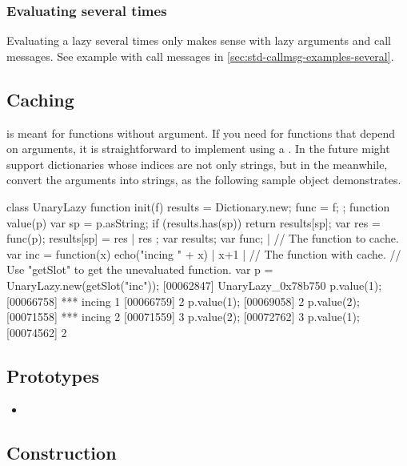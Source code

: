 \subsubsection{Evaluating several times}

Evaluating a lazy several times only makes sense with lazy arguments
and call messages. See example with call messages in
\autoref{sec:std-callmsg-examples-several}.


\subsection{Caching}

 is meant for functions without argument.  If you need
 for functions that depend on arguments, it is
straightforward to implement using a .  In the
future \us might support dictionaries whose indices are not only
strings, but in the meanwhile, convert the arguments into
strings, as the following sample object demonstrates.

\begin{urbiscript}
class UnaryLazy
{
  function init(f)
  {
    results = Dictionary.new;
    func = f;
  };
  function value(p)
  {
    var sp = p.asString;
    if (results.has(sp))
      return results[sp];
    var res = func(p);
    results[sp] = res |
    res
  };
  var results;
  var func;
} |
// The function to cache.
var inc = function(x) { echo("incing " + x) | x+1 } |
// The function with cache.
// Use "getSlot" to get the unevaluated function.
var p = UnaryLazy.new(getSlot("inc"));
[00062847] UnaryLazy_0x78b750
p.value(1);
[00066758] *** incing 1
[00066759] 2
p.value(1);
[00069058] 2
p.value(2);
[00071558] *** incing 2
[00071559] 3
p.value(2);
[00072762] 3
p.value(1);
[00074562] 2
\end{urbiscript}

\subsection{Prototypes}

\begin{itemize}
\item {}
\end{itemize}

\subsection{Construction}

